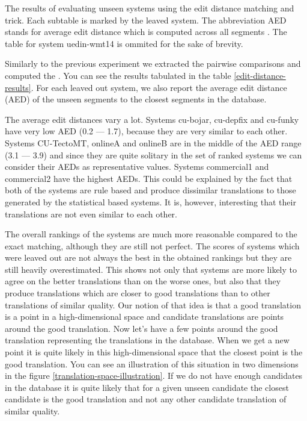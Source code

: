 \begin{table}
\caption[Results of evaluating unseen systems by edit distance matching]{The results of
  evaluating unseen systems using the edit distance matching and
   trick. Each subtable is marked by the leaved system.
  The abbreviation AED stands for average edit distance which is computed
across all segments . The table for system uedin-wmt14 is ommited for the sake
of brevity.}

  \label{edit-distance-results}
\end{table}

Similarly to the previous experiment we extracted the pairwise comparisons and
computed the . You can see the results
tabulated in the table \ref{edit-distance-results}. For each leaved out system,
we also report the average edit distance (AED) of the unseen segments to the closest
segments in the database.

The average edit distances vary a lot. Systems cu-bojar,
cu-depfix and cu-funky have very low AED (0.2 --- 1.7), because they are very
similar to each other. Systems CU-TectoMT, onlineA and onlineB are in the
middle of the AED range (3.1 --- 3.9) and since they are quite solitary in the
set of ranked systems we can consider their AEDs as representative values.
Systems commercial1 and commercial2 have the highest AEDs. This could be
explained by the fact that both of the systems are rule based and produce
dissimilar translations to those generated by the statistical based systems. It
is, however, interesting that their translations are not even similar to each
other.

The overall rankings of the systems are much more reasonable compared to the
exact matching, although they are still not perfect. The scores of systems
which were leaved out are not always the best in the obtained rankings but they
are still heavily overestimated. This shows not only that systems are more
likely to agree on the better translations than on the worse ones, but also
that they produce translations which are closer to good translations than to
other translations of similar quality. Our notion of that idea is that a good
translation is a point  in a high-dimensional space and candidate translations
are points around the good translation. Now let's have a few points around the
good translation representing the translations in the database. When we get a
new point it is quite likely in this high-dimensional space that the closest
point is the good translation. You can see an illustration of this situation in
two dimensions in the figure \ref{translation-space-illustration}.  If we do not have enough candidates in the
database it is quite likely that for a given unseen candidate the closest
candidate is the good translation and not any other candidate translation of
similar quality.

